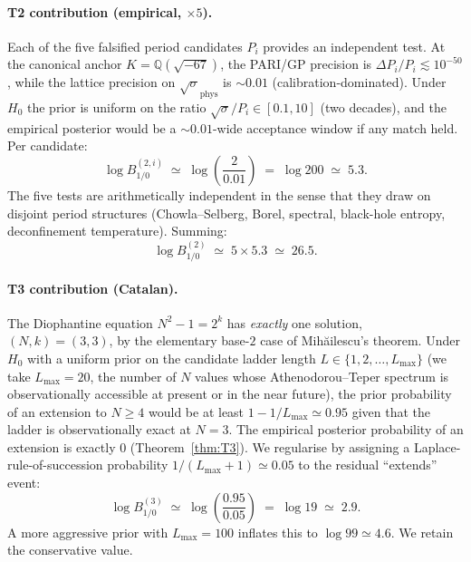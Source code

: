\documentclass[aps,prl,reprint,superscriptaddress,floatfix,nofootinbib,amssymb]{revtex4-2}
\theoremstyle{definition}
\theoremstyle{remark}
\newcommand{\Q}{\mathbb{Q}}
\begin{document}
\paragraph{T2 contribution (empirical, $\times 5$).} Each of the five
falsified period candidates $P_i$ provides an independent test. At the
canonical anchor $K = \Q(\sqrt{-67})$, the PARI/GP precision is
$\Delta P_i / P_i \lesssim 10^{-50}$, while the lattice precision on
$\sqrt{\sigma}_{\mathrm{phys}}$ is $\sim 0.01$ (calibration-dominated).
Under $H_0$ the prior is uniform on the ratio
$\sqrt{\sigma}/P_i \in [0.1, 10]$ (two decades), and the empirical
posterior would be a $\sim 0.01$-wide acceptance window if any match
held. Per candidate:
\begin{equation}\label{eq:logBT2single}
\log B^{(2,i)}_{1/0} \;\simeq\; \log\!\left(\frac{2}{0.01}\right)
\;=\; \log 200 \;\simeq\; 5.3.
\end{equation}
The five tests are arithmetically independent in the sense that they
draw on disjoint period structures (Chowla--Selberg, Borel, spectral,
black-hole entropy, deconfinement temperature). Summing:
\begin{equation}\label{eq:logBT2}
\log B^{(2)}_{1/0} \;\simeq\; 5 \times 5.3 \;\simeq\; 26.5.
\end{equation}

\paragraph{T3 contribution (Catalan).} The Diophantine equation
$N^2-1 = 2^k$ has \emph{exactly} one solution, $(N,k)=(3,3)$, by the
elementary base-$2$ case of Mih\u{a}ilescu's theorem. Under $H_0$ with
a uniform prior on the candidate ladder length $L\in\{1,2,\ldots,
L_{\max}\}$ (we take $L_{\max}=20$, the number of $N$ values whose
Athenodorou--Teper spectrum is observationally accessible at present
or in the near future), the prior probability of an extension to
$N \ge 4$ would be at least $1 - 1/L_{\max} \simeq 0.95$ given that
the ladder is observationally exact at $N=3$. The empirical posterior
probability of an extension is exactly $0$ (Theorem~\ref{thm:T3}). We
regularise by assigning a Laplace-rule-of-succession probability
$1/(L_{\max}+1) \simeq 0.05$ to the residual ``extends'' event:
\begin{equation}\label{eq:logBT3}
\log B^{(3)}_{1/0} \;\simeq\; \log\!\left(\frac{0.95}{0.05}\right)
\;=\; \log 19 \;\simeq\; 2.9.
\end{equation}
A more aggressive prior with $L_{\max}=100$ inflates this to
$\log 99 \simeq 4.6$. We retain the conservative value.
\end{document}
